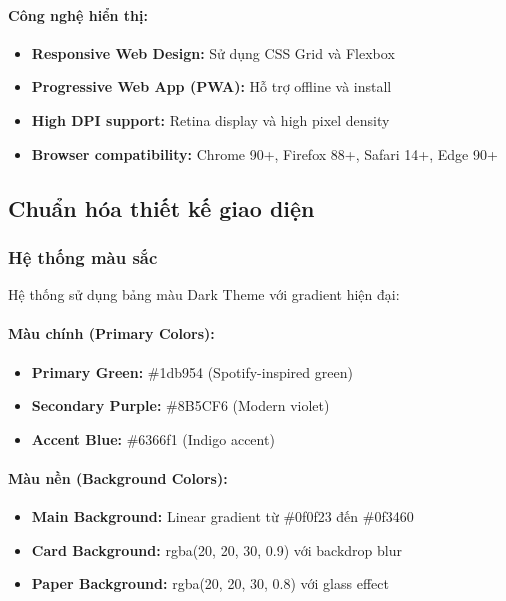 \paragraph{Công nghệ hiển thị:}
\begin{itemize}
    \item \textbf{Responsive Web Design:} Sử dụng CSS Grid và Flexbox
    \item \textbf{Progressive Web App (PWA):} Hỗ trợ offline và install
    \item \textbf{High DPI support:} Retina display và high pixel density
    \item \textbf{Browser compatibility:} Chrome 90+, Firefox 88+, Safari 14+, Edge 90+
\end{itemize}

\subsection{Chuẩn hóa thiết kế giao diện}

\subsubsection{Hệ thống màu sắc}

Hệ thống sử dụng bảng màu Dark Theme với gradient hiện đại:

\paragraph{Màu chính (Primary Colors):}
\begin{itemize}
    \item \textbf{Primary Green:} \#1db954 (Spotify-inspired green)
    \item \textbf{Secondary Purple:} \#8B5CF6 (Modern violet)
    \item \textbf{Accent Blue:} \#6366f1 (Indigo accent)
\end{itemize}

\paragraph{Màu nền (Background Colors):}
\begin{itemize}
    \item \textbf{Main Background:} Linear gradient từ \#0f0f23 đến \#0f3460
    \item \textbf{Card Background:} rgba(20, 20, 30, 0.9) với backdrop blur
    \item \textbf{Paper Background:} rgba(20, 20, 30, 0.8) với glass effect
\end{itemize}

